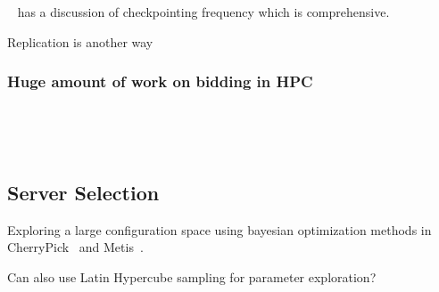 ~\cite{dongarra_fault_nodate} has a discussion of checkpointing frequency which is comprehensive.

Replication is another way~\cite{walters_replication-based_2009}


\subsubsection{Huge amount of work on bidding in HPC}

~\cite{wolski_probabilistic_2017}

~\cite{guo_bidding_2015}


\subsection{Server Selection}
Exploring a large configuration space using bayesian optimization methods in CherryPick~\cite{cherrypick} and Metis~\cite{Metis-atc18}.

Can also use Latin Hypercube sampling for parameter exploration?



